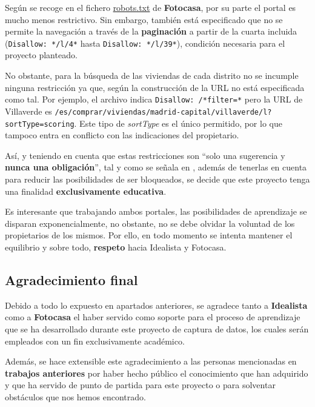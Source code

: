 \documentclass[12pt]{article}
\begin{document}
Según se recoge en el fichero \href{https://www.fotocasa.es/robots.txt}{robots.txt} de \textbf{Fotocasa}, por su parte el portal es mucho menos restrictivo. Sin embargo, también está especificado que no se permite la navegación a través de la \textbf{paginación} a partir de la cuarta incluida (\verb|Disallow: */l/4*| hasta \verb|Disallow: */l/39*|), condición necesaria para el proyecto planteado.

No obstante, para la búsqueda de las viviendas de cada distrito no se incumple ninguna restricción ya que, según la construcción de la URL no está especificada como tal. Por ejemplo, el archivo indica \verb|Disallow: /*filter=*| pero la URL de Villaverde es \verb|/es/comprar/viviendas/madrid-capital/villaverde/l?sortType=scoring|. Este tipo de \textit{sortType} es el único permitido, por lo que tampoco entra en conflicto con las indicaciones del propietario. 

Así, y teniendo en cuenta que estas restricciones son ``solo una sugerencia y \textbf{nunca una obligación}'', tal y como se señala en \cite{tip2}, además de tenerlas en cuenta para reducir las posibilidades de ser bloqueados, se decide que este proyecto tenga una finalidad \textbf{exclusivamente educativa}. 

Es interesante que trabajando ambos portales, las posibilidades de aprendizaje se disparan exponencialmente, no obstante, no se debe olvidar la voluntad de los propietarios de los mismos. Por ello, en todo momento se intenta mantener el equilibrio y sobre todo, \textbf{respeto} hacia Idealista y Fotocasa. 

\vspace{-1.5em}\subsection*{Agradecimiento final}\vspace{-1.0em}

Debido a todo lo expuesto en apartados anteriores, se agradece tanto a \textbf{Idealista} como a \textbf{Fotocasa} el haber servido como soporte para el proceso de aprendizaje que se ha desarrollado durante este proyecto de captura de datos, los cuales serán empleados con un fin exclusivamente académico. 

Además, se hace extensible este agradecimiento a las personas mencionadas en \textbf{trabajos anteriores} por haber hecho público el conocimiento que han adquirido y que ha servido de punto de partida para este proyecto o para solventar obstáculos que nos hemos encontrado. 
\end{document}
